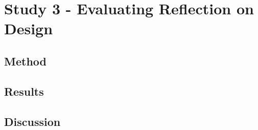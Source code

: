 \section{Study 3 - Evaluating Reflection on Design} 

\subsection{Method}

\subsection{Results}

\subsection{Discussion}